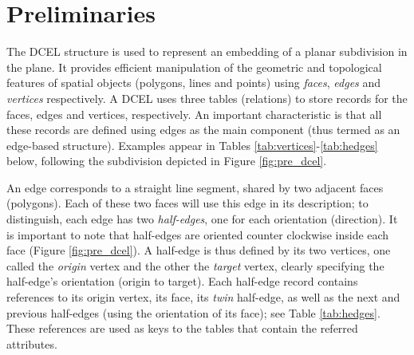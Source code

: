 \section{Preliminaries}
\label{sec:prelim}

The DCEL \cite{muller_finding_1978} structure is used to represent an embedding of a planar subdivision in the plane. It provides efficient manipulation of the geometric and topological features of spatial objects (polygons, lines and points) using \textit{faces}, \textit{edges} and \textit{vertices} respectively.  
A DCEL uses three tables (relations) to store records for the faces, edges and vertices, respectively. 
An important characteristic is that all these records are defined using edges as the main component (thus termed as an edge-based structure). 
Examples appear in Tables \ref{tab:vertices}-\ref{tab:hedges} below, following the subdivision depicted in Figure \ref{fig:pre_dcel}.


An edge corresponds to a straight line segment, shared by two adjacent faces (polygons). 
Each of these two faces will use this edge in its description; to distinguish, each edge has two \textit{half-edges}, one for each orientation (direction).
It is important to note that half-edges are oriented counter clockwise inside each face (Figure \ref{fig:pre_dcel}).
A half-edge is thus defined by its two vertices, one called the \textit{origin} vertex and the other the \textit{target} vertex, clearly specifying the half-edge's orientation (origin to target).
Each half-edge record contains references to its origin vertex, its face, its \textit{twin} half-edge, as well as the next and previous half-edges (using the orientation of its face); see Table \ref{tab:hedges}. These references are used as keys to the tables that contain the referred attributes. 

